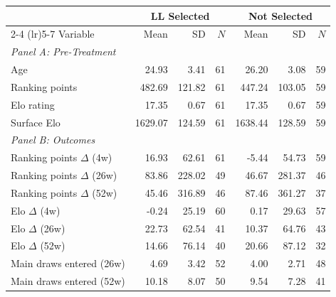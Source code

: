 \begin{tabular}{p{4cm} rrr rrr}
\toprule
 & \multicolumn{3}{c}{LL Selected} & \multicolumn{3}{c}{Not Selected} \\
\cmidrule(lr){2-4} \cmidrule(lr){5-7}
Variable & Mean & SD & $N$ & Mean & SD & $N$ \\
\midrule
\multicolumn{7}{l}{\textit{Panel A: Pre-Treatment}} \\
\quad Age & 24.93 & 3.41 & 61 & 26.20 & 3.08 & 59 \\
\quad Ranking points & 482.69 & 121.82 & 61 & 447.24 & 103.05 & 59 \\
\quad Elo rating & 17.35 & 0.67 & 61 & 17.35 & 0.67 & 59 \\
\quad Surface Elo & 1629.07 & 124.59 & 61 & 1638.44 & 128.59 & 59 \\
\midrule
\multicolumn{7}{l}{\textit{Panel B: Outcomes}} \\
\quad Ranking points $\Delta$ (4w) & 16.93 & 62.61 & 61 & -5.44 & 54.73 & 59 \\
\quad Ranking points $\Delta$ (26w) & 83.86 & 228.02 & 49 & 46.67 & 281.37 & 46 \\
\quad Ranking points $\Delta$ (52w) & 45.46 & 316.89 & 46 & 87.46 & 361.27 & 37 \\
\quad Elo $\Delta$ (4w) & -0.24 & 25.19 & 60 & 0.17 & 29.63 & 57 \\
\quad Elo $\Delta$ (26w) & 22.73 & 62.54 & 41 & 10.37 & 64.76 & 43 \\
\quad Elo $\Delta$ (52w) & 14.66 & 76.14 & 40 & 20.66 & 87.12 & 32 \\
\quad Main draws entered (26w) & 4.69 & 3.42 & 52 & 4.00 & 2.71 & 48 \\
\quad Main draws entered (52w) & 10.18 & 8.07 & 50 & 9.54 & 7.28 & 41 \\
\bottomrule
\end{tabular}
